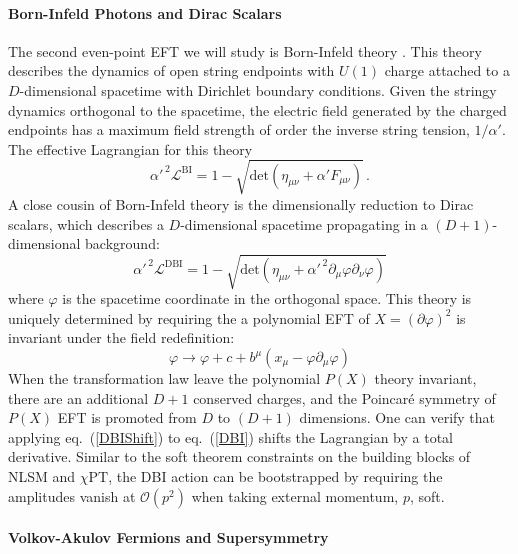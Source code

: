 \documentclass[12pt,letter]{article}
\def\eqn#1{eq.~(\ref{#1})}
\def\be{\begin{equation}}
\def\ee{\end{equation}}
\begin{document}
\paragraph{Born-Infeld Photons and Dirac Scalars}
The second even-point EFT we will study is Born-Infeld theory \cite{}. This theory describes the dynamics of open string endpoints with $U(1)$ charge attached to a $D$-dimensional spacetime with Dirichlet boundary conditions. Given the stringy dynamics orthogonal to the spacetime, the electric field generated by the charged endpoints has a maximum field strength of order the inverse string tension, $1/\alpha'$. The effective Lagrangian for this theory
\begin{equation}
 \label{biLag}
  \alpha'^{\,2}\mathcal{L}^{\text{BI}} = 1-\sqrt{\text{det}(\eta_{\mu\nu}+\alpha' F_{\mu\nu})} \,.
\end{equation}
A close cousin of Born-Infeld theory is the dimensionally reduction to Dirac scalars, which describes a $D$-dimensional spacetime propagating in a $(D+1)$-dimensional background:
\begin{equation}
 \label{DBI}
  \alpha'^{\,2}\mathcal{L}^{\text{DBI}} =1- \sqrt{\text{det}(\eta_{\mu\nu}+\alpha'^{\,2} \partial_\mu \varphi \partial_\nu \varphi)}
\end{equation}
where $\varphi$ is the spacetime coordinate in the orthogonal space. This theory is uniquely determined by requiring the a polynomial EFT of $X=(\partial \varphi)^2$ is invariant under the field redefinition:
\be\label{DBIShift}
\varphi \rightarrow \varphi + c + b^{\mu} (x_\mu - \varphi \partial_\mu \varphi)
\ee
When the transformation law leave the polynomial $P(X)$ theory invariant, there are an additional $D+1$ conserved charges, and the Poincar\'{e} symmetry of $P(X)$ EFT is promoted from $D$ to $(D+1)$ dimensions. One can verify that applying \eqn{DBIShift} to \eqn{DBI} shifts the Lagrangian by a total derivative. Similar to the soft theorem constraints on the building blocks of NLSM and $\chi \text{PT}$, the DBI action can be bootstrapped by requiring the amplitudes vanish at $\mathcal{O}(p^2)$ when taking external momentum, $p$, soft. 
\paragraph{Volkov-Akulov Fermions and Supersymmetry}
\end{document}
